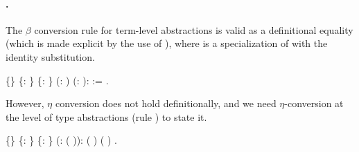 \paragraph{.} The $\beta$ conversion rule for term-level
  abstractions is valid as a definitional equality (which is made explicit
  by the use of ), where  is a specialization of
   with the identity substitution.  \begin{coqdoccode}
\coqdocemptyline
\coqdocnoindent
{}  \{\} \{: \} \{: \} (: ) (: ):\coqdoceol
\coqdocindent{1.00em}
\coqdocnotation{[}  \coqdocnotation{$\star$} \coqdocnotation{]} \coqdocnotation{=} \coqdocnotation{[} \coqdocnotation{$\circ$}  \coqdocnotation{]} :=  \coqdocvar{\_}.\coqdoceol
\coqdocemptyline
\end{coqdoccode}
 \noindent 
  However, $\eta$ conversion does not hold definitionally, and we need 
  $\eta$-conversion at the level of type abstractions (rule ) 
  to state it.
\begin{coqdoccode}
\coqdocemptyline
\coqdocemptyline
\coqdocnoindent
{}  \{\} \{: \} \{: \} (: ( )):\coqdoceol
\coqdocindent{1.00em}
 (  \coqdocnotation{$\star$}  )   ( )  .\coqdoceol
\coqdocemptyline
\end{coqdoccode}
